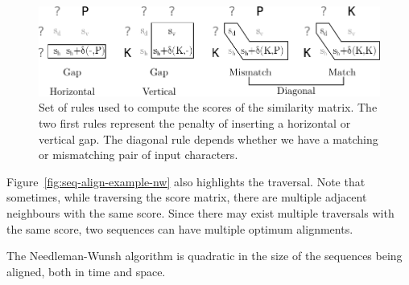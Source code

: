 \begin{figure}[h]
  \centering
  \includegraphics[scale=0.8]{src/background/figs/seq-align-rules}
  \caption{Set of rules used to compute the scores of the similarity matrix.
           The two first rules represent the penalty of inserting a horizontal or vertical gap.
           The diagonal rule depends whether we have a matching or mismatching pair of input characters.}
  \label{fig:seq-align-rules}
\end{figure}


Figure~\ref{fig:seq-align-example-nw} also highlights the traversal. 
Note that sometimes, while traversing the score matrix, there are multiple adjacent neighbours with the same score.
Since there may exist multiple traversals with the same score, two sequences can have multiple optimum alignments.

The Needleman-Wunsh algorithm is quadratic in the size of the sequences being aligned, both in time and space.

